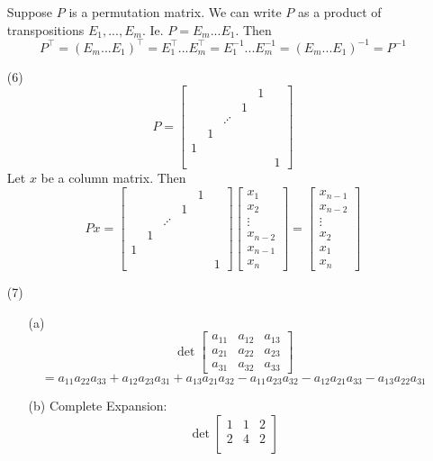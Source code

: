 \documentclass[12pt]{article}
\begin{document}
\begin{itemize}
Suppose $P$ is a permutation matrix. We can write $P$ as a product of transpositions $E_1, ..., E_m$. Ie. $P = E_m...E_1$. Then 
$$P^\top = (E_m...E_1)^\top = E_1^\top...E_m^\top = E_1^{-1}...E_m^{-1} = (E_m...E_1)^{-1} = P^{-1}$$
\item[(6)]
$$P = \begin{bmatrix}
& & & & 1 &\\
& & & 1 \\
& & \iddots \\
& 1 \\
1 \\
& & & & & 1
\end{bmatrix}$$
Let $x$ be a column matrix. Then
$$Px = \begin{bmatrix}
& & & & 1 &\\
& & & 1 \\
& & \iddots \\
& 1 \\
1 \\
& & & & & 1
\end{bmatrix}\begin{bmatrix}
x_1 \\
x_2 \\
\vdots \\
x_{n-2} \\
x_{n-1} \\
x_n
\end{bmatrix} = \begin{bmatrix}
x_{n-1} \\
x_{n-2} \\
\vdots \\
x_2 \\
x_1 \\
x_n
\end{bmatrix}$$
\item[(7)]
\begin{itemize}
\item[(a)]
$$\det\begin{bmatrix}
a_{11} & a_{12} & a_{13} \\
a_{21} & a_{22} & a_{23} \\
a_{31} & a_{32} & a_{33}
\end{bmatrix}$$
$$= a_{11}a_{22}a_{33} + a_{12}a_{23}a_{31} + a_{13}a_{21}a_{32} - a_{11}a_{23}a_{32} - a_{12}a_{21}a_{33} - a_{13}a_{22}a_{31}$$
\item[(b)]
Complete Expansion:
$$\det\begin{bmatrix}
1 & 1 & 2 \\
2 & 4 & 2 \\

\end{bmatrix}$$
\end{itemize}
\end{itemize}
\end{document}

